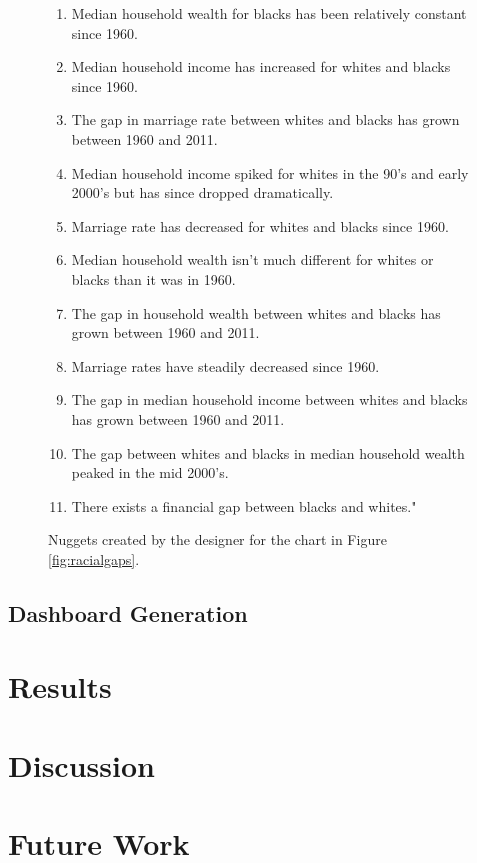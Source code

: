 \documentclass{sigchi}
\begin{document}
\begin{figure}[t]
  \begin{framed}
  \begin{center}
    \begin{enumerate}
    \item Median household wealth for blacks has been relatively constant since 1960.
    \item Median household income has increased for whites and blacks since 1960.
    \item The gap in marriage rate between whites and blacks has grown between 1960 and 2011.
    \item Median household income spiked for whites in the 90's and early 2000's but has since dropped dramatically.
    \item Marriage rate has decreased for whites and blacks since 1960.
    \item Median household wealth isn't much different for whites or blacks than it was in 1960.
    \item The gap in household wealth between whites and blacks has grown between 1960 and 2011.
    \item Marriage rates have steadily decreased since 1960.
    \item The gap in median household income between whites and blacks has grown between 1960 and 2011.
    \item The gap between whites and blacks in median household wealth peaked in the mid 2000's.
    \item There exists a financial gap between blacks and whites."
    \end{enumerate}
  \end{center}
  \end{framed}
  \caption{Nuggets created by the designer for the chart in Figure \ref{fig:racialgaps}.}
  \label{fig:nuggets}
\end{figure}

\subsection{Dashboard Generation}

\section{Results}

\section{Discussion}

\section{Future Work}



\end{document}
